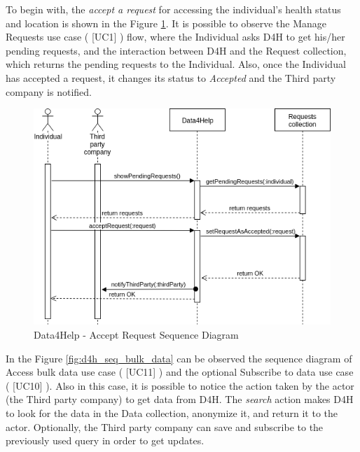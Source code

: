 \documentclass[12pt]{report}
\newcommand\usecase[1]{ [UC#1] }
\begin{document}
To begin with, the \textit{accept a request} for accessing the individual's health status and location is shown in the Figure \ref{fig:d4h_seq_accept_request}. It is possible to observe the Manage Requests use case (\usecase{1}) flow, where the Individual asks D4H to get his/her pending requests, and the interaction between D4H and the Request collection, which returns the pending requests to the Individual. Also, once the Individual has accepted a request, it changes its status to \textit{Accepted} and the Third party company is notified. \\

\begin{figure}[H]
\centering
	\includegraphics[scale=0.6]{Diagrams/d4h_seq_accept_request.png}
\caption[Data4Help - Accept Request S7equence Diagram]{Data4Help - Accept Request Sequence Diagram}
\label{fig:d4h_seq_accept_request}
\end{figure}

In the Figure \ref{fig:d4h_seq_bulk_data} can be observed the sequence diagram of Access bulk data use case (\usecase{11}) and the optional Subscribe to data use case (\usecase{10}). Also in this case, it is possible to notice the action taken by the actor (the Third party company) to get data from D4H. The \textit{search} action makes D4H to look for the data in the Data collection, anonymize it, and return it to the actor. Optionally, the Third party company can save and subscribe to the previously used query in order to get updates.\\
\end{document}
